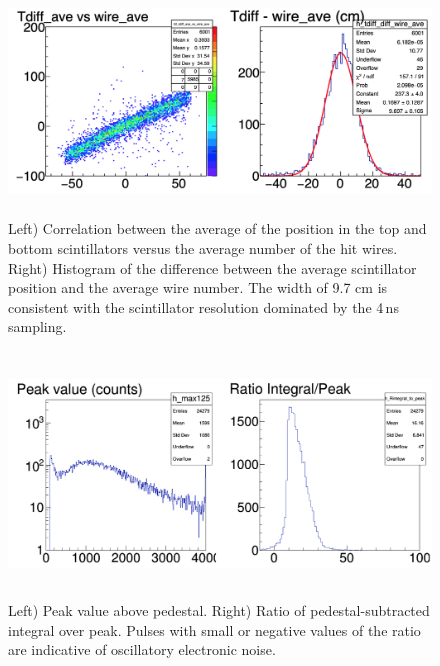 \documentclass[12pt]{article}
\begin{document}
\begin{figure}[tbph]
\begin{center}
\includegraphics[height=6cm,clip=true]{MWPC_scint_correlation}
\caption{Left) Correlation between the average of the position in the top and bottom scintillators versus the average number of the hit wires. Right) Histogram of the difference between the average scintillator position and the average wire number. The width of 9.7 cm is consistent with the scintillator resolution dominated by the 4\,ns sampling.
\label{fig:MWPC_scint_correlation}}
\end{center}
\end{figure} 

\begin{figure}[tbph]
\begin{center}
\includegraphics[height=6.5cm,clip=true]{Rint_to_peak}
\caption{Left) Peak value above pedestal. Right) Ratio of pedestal-subtracted integral over peak. Pulses with small or negative values of the ratio are indicative of oscillatory electronic noise.
\label{fig:Rint_to_peak}}
\end{center}
\end{figure} 
\end{document}
